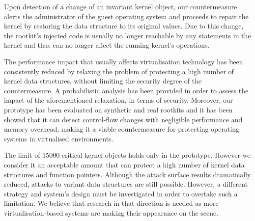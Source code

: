 Upon detection of a change of an invariant kernel object, our countermeasure alerts the administrator of the guest operating system and proceeds to repair the kernel by restoring the data structure to its original values. Due to this change, the rootkit's injected code is usually no longer reachable by any statements in the kernel and thus can no longer affect the running kernel's operations. 

The performance impact that usually affects virtualisation technology has been consistently reduced by relaxing the problem of protecting a high number of kernel data structures, without limiting the security degree of the countermeasure. A probabilistic analysis has been provided in order to assess the impact of the aforementioned relaxation, in terms of security. 
Moreover, our prototype has been evaluated on synthetic and real rootkits and it has been showed that it can detect control-flow changes with negligible performance and memory overhead, making it a viable countermeasure for protecting operating systems in virtualised environments.

The limit of 15000 critical kernel objects holds only in the prototype. However we consider it an acceptable amount that can protect a high number of kernel data structures and function pointers. 
Although the attack surface results dramatically reduced, attacks to variant data structures are still possible. However, a different strategy and system's design must be investigated in order to overtake such a limitation. We believe that research in that direction is needed as more virtualisation-based systems are making their appearance on the scene. 
